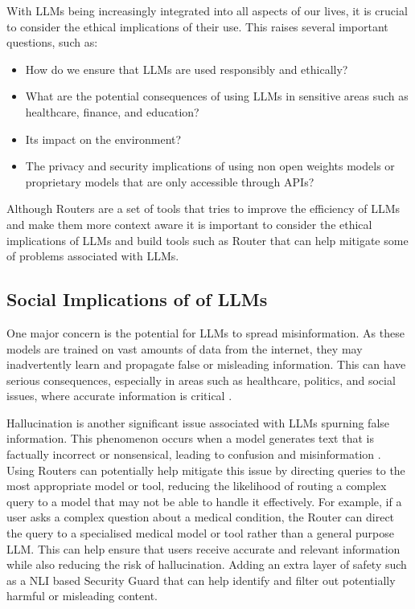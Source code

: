 With LLMs being increasingly integrated into all aspects of our lives, it is crucial to consider the ethical implications of their use. This raises several important questions, 
such as: 

\begin{itemize}
    \item How do we ensure that LLMs are used responsibly and ethically?
    \item What are the potential consequences of using LLMs in sensitive areas such as healthcare, finance, and education?
    \item Its impact on the environment?
    \item The privacy and security implications of using non open weights models or proprietary models that are only accessible through APIs?
\end{itemize}

Although Routers are a set of tools that tries to improve the efficiency of LLMs and make them more context aware it is important to consider the ethical implications of LLMs and build tools such as Router that can help mitigate some of problems associated with LLMs.

\subsection{Social Implications of of LLMs}
\label{sec:discussion-social-implications-of-llms}

One major concern is the potential for LLMs to spread misinformation. As these models are trained on vast amounts of data from the internet, they may inadvertently learn and propagate false or misleading information. This can have serious consequences, especially in areas such as healthcare, politics, and social issues, where accurate information is critical \citep{strubell2019energypolicyconsiderationsdeep}.

Hallucination is another significant issue associated with LLMs spurning false information. This phenomenon occurs when a model generates text that is factually incorrect or nonsensical, leading to confusion and misinformation \citep{bender2021dangers}. Using Routers can potentially help mitigate this issue by directing queries to the most appropriate model or tool, reducing the likelihood of routing a complex query to a model that may not be able to handle it effectively. For example, if a user asks a complex question about a medical condition, the Router can direct the query to a specialised medical model or tool rather than a general purpose LLM. This can help ensure that users receive accurate and relevant information while also reducing the risk of hallucination. Adding an extra layer of safety such as a NLI based Security Guard that can help identify and filter out potentially harmful or misleading content.

